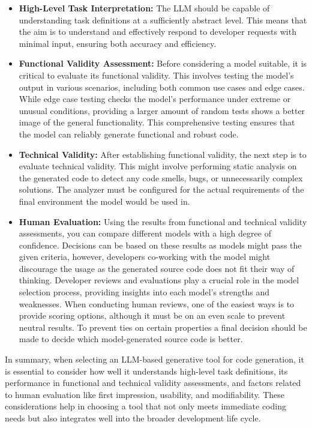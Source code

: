 \begin{itemize}
	\item \textbf{High-Level Task Interpretation:} The LLM should be capable of understanding task definitions at a sufficiently abstract level. This means that the aim is to understand and effectively respond to developer requests with minimal input, ensuring both accuracy and efficiency.
	
	\item \textbf{Functional Validity Assessment:} Before considering a model suitable, it is critical to evaluate its functional validity. This involves testing the model's output in various scenarios, including both common use cases and edge cases. While edge case testing checks the model's performance under extreme or unusual conditions, providing a larger amount of random tests shows a better image of the general functionality. This comprehensive testing ensures that the model can reliably generate functional and robust code.
	
	\item \textbf{Technical Validity:} After establishing functional validity, the next step is to evaluate technical validity. This might involve performing static analysis on the generated code to detect any code smells, bugs, or unnecessarily complex solutions. The analyzer must be configured for the actual requirements of the final environment the model would be used in.
	
	\item \textbf{Human Evaluation:} Using the results from functional and technical validity assessments, you can compare different models with a high degree of confidence. Decisions can be based on these results as models might pass the given criteria, however, developers co-working with the model might discourage the usage as the generated source code does not fit their way of thinking. Developer reviews and evaluations play a crucial role in the model selection process, providing insights into each model's strengths and weaknesses. When conducting human reviews, one of the easiest ways is to provide scoring options, although it must be on an even scale to prevent neutral results. To prevent ties on certain properties a final decision should be made to decide which model-generated source code is better.
	
\end{itemize}

In summary, when selecting an LLM-based generative tool for code generation, it is essential to consider how well it understands high-level task definitions, its performance in functional and technical validity assessments, and factors related to human evaluation like first impression, usability, and modifiability.
These considerations help in choosing a tool that not only meets immediate coding needs but also integrates well into the broader development life cycle.

